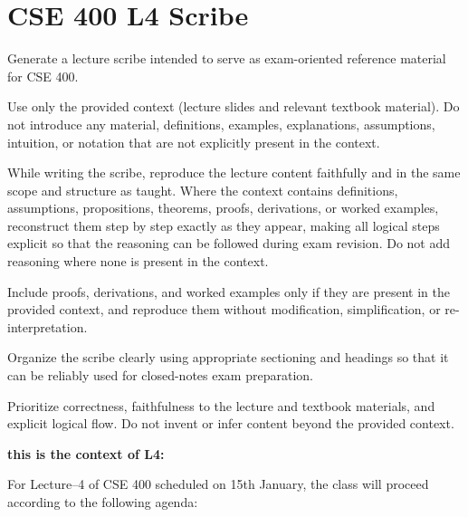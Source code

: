 \documentclass[12pt]{article}
\begin{document}
\section*{CSE 400 L4 Scribe}

Generate a lecture scribe intended to serve as exam-oriented reference material for CSE 400.

Use only the provided context (lecture slides and relevant textbook material). Do not introduce any material, definitions, examples, explanations, assumptions, intuition, or notation that are not explicitly present in the context.

While writing the scribe, reproduce the lecture content faithfully and in the same scope and structure as taught. Where the context contains definitions, assumptions, propositions, theorems, proofs, derivations, or worked examples, reconstruct them step by step exactly as they appear, making all logical steps explicit so that the reasoning can be followed during exam revision. Do not add reasoning where none is present in the context.

Include proofs, derivations, and worked examples only if they are present in the provided context, and reproduce them without modification, simplification, or re-interpretation.

Organize the scribe clearly using appropriate sectioning and headings so that it can be reliably used for closed-notes exam preparation.

Prioritize correctness, faithfulness to the lecture and textbook materials, and explicit logical flow. Do not invent or infer content beyond the provided context.

\bigskip

\textbf{this is the context of L4:}

For Lecture--4 of CSE 400 scheduled on 15th January, the class will proceed according to the following agenda:
\end{document}
